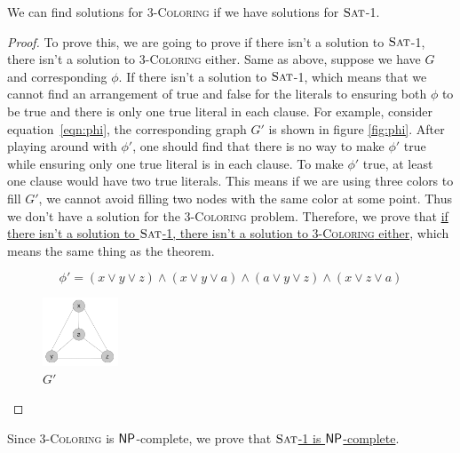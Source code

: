     \begin{theo}
        We can find solutions for 3-\textsc{Coloring} if we have solutions for $\textsc{Sat}$-1.
    \end{theo}
    \begin{proof}
        To prove this, we are going to prove if there isn't a solution to $\textsc{Sat}$-1, there isn't a solution to 3-\textsc{Coloring} 
        either. Same as above, suppose we have $G$ and corresponding $\phi$. If there isn't a solution to $\textsc{Sat}$-1, which means 
        that we cannot find an arrangement of true and false for the literals to ensuring both $\phi$ to be true and there is only 
        one true literal in each clause. For example, consider equation~\ref{eqn:phi}, the corresponding graph $G'$ is shown in figure 
        \ref{fig:phi}. After playing around with $\phi'$, one should find that there is no way to make $\phi'$ true while ensuring 
        only one true literal is in each clause. To make $\phi'$ true, at least one clause would have two true literals. 
        This means if we are using three colors to fill $G'$, we cannot avoid filling two nodes with the same color at some point. 
        Thus we don't have a solution for the 3-\textsc{Coloring} problem. Therefore, we prove that \underline{if there isn't a solution to $\textsc{Sat}$-1, 
        there isn't a solution to 3-\textsc{Coloring} either}, which means the same thing as the theorem. 

        \begin{equation}
            \phi' = (x \vee y \vee z) \wedge (x \vee y \vee a) \wedge (a \vee y \vee z) \wedge (x \vee z \vee a)
            \label{eqn:phi}
        \end{equation}
        
        \begin{figure}
            \centering
            \includegraphics[width=0.2\textwidth]{3_phi.png}
            \caption{$G'$}
            \label{fig:G}
        \end{figure}
    \end{proof}

    Since 3-\textsc{Coloring} is $\mathsf{NP}$-complete, we prove that \underline{$\textsc{Sat}$-1 is $\mathsf{NP}$-complete}.
